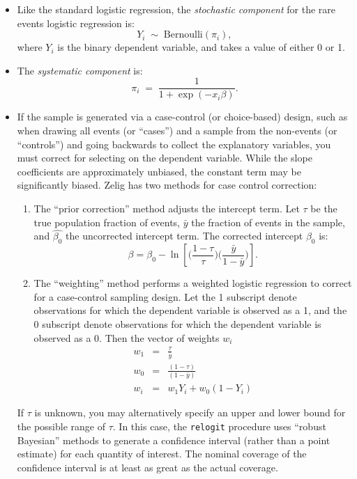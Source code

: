 \begin{itemize}
\item Like the standard logistic regression, the \emph{stochastic
    component} for the rare events logistic regression is:
\begin{equation*}
  Y_i \; \sim \; \textrm{Bernoulli}(\pi_i), 
\end{equation*}
where $Y_i$ is the binary dependent variable, and takes a value of
either 0 or 1.

\item The \emph{systematic component} is: 
  \begin{equation*}
    \pi_i \; = \; \frac{1}{1 + \exp(-x_i \beta)}.
  \end{equation*}


\item If the sample is generated via a case-control (or choice-based)
  design, such as when drawing all events (or ``cases'') and a sample
  from the non-events (or ``controls'') and going backwards to collect
  the explanatory variables, you must correct for selecting on the
  dependent variable.  While the slope coefficients are approximately
  unbiased, the constant term may be significantly biased.  Zelig has
two methods for case control correction:  
\begin{enumerate}
\item The ``prior correction'' method 
adjusts the intercept term.  Let $\tau$ be the true population
fraction of events, $\bar{y}$ the fraction of events in the sample,
and $\hat{\beta_0}$ the uncorrected intercept term.  The corrected
intercept $\beta_0$ is:
\begin{equation*}
\beta =  \hat{\beta_0} - \ln \left[ \bigg( \frac{1 - \tau}{\tau}
  \bigg) \bigg( \frac{\bar{y}}{1 - \bar{y}} \bigg) \right].
\end{equation*}

\item The ``weighting'' method performs a weighted logistic regression to
correct for a case-control sampling design.  Let the 1 subscript
denote observations for which the dependent variable is observed as a
1, and the 0 subscript denote observations for which the dependent
variable is observed as a 0.  Then the vector of weights $w_i$
\begin{eqnarray*}
w_1 &=& \frac{\tau}{\bar{y}} \\
w_0 &=& \frac{(1 - \tau)}{(1 - \bar{y})} \\
w_i &=& w_1 Y_i + w_0 (1 - Y_i)
\end{eqnarray*} 
\end{enumerate}
  If $\tau$ is unknown, you may alternatively specify an upper and
  lower bound for the possible range of $\tau$.  In this case, the
  {\tt relogit} procedure uses ``robust Bayesian'' methods to generate
  a confidence interval (rather than a point estimate) for each
  quantity of interest.  The nominal coverage of the confidence
  interval is at least as great as the actual coverage.
  

\end{itemize}
